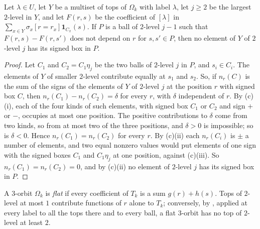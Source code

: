 \begin{lemma}\label{lem:flatthree}
Let $\lambda\in U$, let $Y$ be a multiset of tops of $\Omega_{k}$ with label
$\lambda$, let $j\ge2$ be the largest $2$-level in $Y$, and let $F(r,s)$ be
the coefficient of $[\lambda]$ in $\sum_{x\in Y}\sigma_{x}[r=r_{x}]\mathbf
1_{C_{x}}(s)$. If $P$ is a ball of $2$-level $j-1$ such that
$F(r,s)-F(r,s')$ does not depend on $r$ for $s,s'\in P$, then no element of
$Y$ of $2$-level $j$ has its signed box in $P$.
\end{lemma}

\begin{proof}
Let $C_{1}$ and $C_{2}=C_{1}\eta_{j}$ be the two balls of $2$-level $j$ in
$P$, and $s_{i}\in C_{i}$. The elements of $Y$ of smaller $2$-level
contribute equally at $s_{1}$ and $s_{2}$. So, if $n_{r}(C)$ is the sum of the
signs of the elements of $Y$ of $2$-level $j$ at the position $r$ with signed
box $C$, then $n_{r}(C_{1})-n_{r}(C_{2})=\delta$ for every $r$, with $\delta$
independent of $r$. By (c)(i), each of the four kinds of
such elements, with signed box $C_{1}$ or $C_{2}$ and sign $+$ or $-$,
occupies at most one position. The positive contributions to $\delta$ come
from two kinds, so from at most two of the three positions, and $\delta>0$
is impossible; so is $\delta<0$. Hence $n_{r}(C_{1})=n_{r}(C_{2})$ for every
$r$. By (c)(ii) each $n_{r}(C_{i})$ is $\pm$ a number of
elements, and two equal nonzero values would put elements of one sign with
the signed boxes $C_{1}$ and $C_{1}\eta_{j}$ at one position, against
(c)(iii). So $n_{r}(C_{1})=n_{r}(C_{2})=0$, and by
(c)(ii) no element of $2$-level $j$ has its signed box
in $P$.
\end{proof}

A $3$-orbit $\Omega_{k}$ is \emph{flat} if every coefficient of $T_{k}$ is
a sum $g(r)+h(s)$. Tops of $2$-level at most $1$ contribute functions of $r$
alone to $T_{k}$; conversely, by , applied at every
label to all the tops there and to every ball, a flat $3$-orbit has no top of
$2$-level at least $2$.

